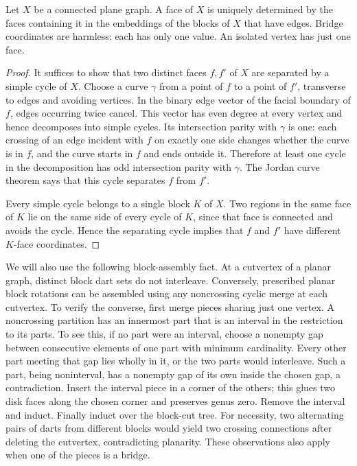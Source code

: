 \begin{lemma}
\label{rep:lem:face-signatures}
Let $X$ be a connected plane graph.  A face of $X$ is uniquely determined by
the faces containing it in the embeddings of the blocks of $X$ that have
edges.  Bridge coordinates are harmless: each has only one value.  An
isolated vertex has just one face.
\end{lemma}

\begin{proof}
It suffices to show that two distinct faces $f,f'$ of $X$ are separated by a
simple cycle of $X$.  Choose a curve $\gamma$ from a point of $f$ to a point
of $f'$, transverse to edges and avoiding vertices.  In the binary edge
vector of the facial boundary of $f$, edges occurring twice cancel.  This
vector has even degree at every vertex and hence decomposes into simple
cycles.  Its intersection parity with $\gamma$ is one: each crossing of an
edge incident with $f$ on exactly one side changes whether the curve is in
$f$, and the curve starts in $f$ and ends outside it.  Therefore at least one
cycle in the decomposition has odd intersection parity with $\gamma$.
The Jordan curve theorem says that this cycle separates $f$ from $f'$.

Every simple cycle belongs to a single block $K$ of $X$.  Two regions in the
same face of $K$ lie on the same side of every cycle of $K$, since that face
is connected and avoids the cycle.  Hence the separating cycle implies that
$f$ and $f'$ have different $K$-face coordinates.
\end{proof}

We will also use the following block-assembly fact.  At a cutvertex of a
planar graph, distinct block dart sets do not interleave.  Conversely,
prescribed planar block rotations can be assembled using any noncrossing
cyclic merge at each cutvertex.  To verify the converse, first merge pieces
sharing just one vertex.  A noncrossing partition has an innermost part that
is an interval in the restriction to its parts.  To see this, if no part
were an interval, choose a nonempty gap between consecutive elements of
one part with minimum cardinality.  Every other part meeting that gap
lies wholly in it, or the two parts would interleave.  Such a part, being
noninterval, has a nonempty gap of its own inside the chosen gap, a
contradiction.  Insert the interval piece in a
corner of the others; this glues two disk faces along the chosen corner and
preserves genus zero.  Remove the interval and induct.  Finally induct over
the block-cut tree.  For necessity, two alternating pairs of darts from
different blocks would yield two crossing connections after deleting the
cutvertex, contradicting planarity.  These observations also apply when one
of the pieces is a bridge.

